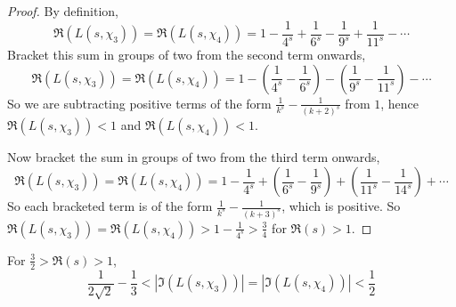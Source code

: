\documentclass{unswmaths}
\begin{document}
    \begin{proof}
        By definition,
        \begin{equation*}
            \Re(L(s,\chi_3)) = \Re(L(s,\chi_4)) = 1-\frac{1}{4^s}+\frac{1}{6^s}-\frac{1}{9^s}+\frac{1}{11^s}-\cdots
        \end{equation*}
        Bracket this sum in groups of two from the second term onwards,
        \begin{equation*}
            \Re(L(s,\chi_3)) = \Re(L(s,\chi_4)) = 1-(\frac{1}{4^s}-\frac{1}{6^s})-(\frac{1}{9^s}-\frac{1}{11^s})-\cdots
        \end{equation*}
        So we are subtracting positive terms of the form $\frac{1}{k^s}-\frac{1}{(k+2)^s}$ from $1$, hence $\Re(L(s,\chi_3)) < 1$
        and $\Re(L(s,\chi_4)) < 1$.
        
        Now bracket the sum in groups of two from the third term onwards,     
        \begin{equation*}
            \Re(L(s,\chi_3)) = \Re(L(s,\chi_4)) = 1-\frac{1}{4^s}+\left(\frac{1}{6^s}-\frac{1}{9^s}\right)+\left(\frac{1}{11^s}-\frac{1}{14^s}\right)+\cdots
        \end{equation*}
        So each bracketed term is of the form $\frac{1}{k^s}-\frac{1}{(k+3)^s}$, which is positive. So $\Re(L(s,\chi_3)) = \Re(L(s,\chi_4)) > 1-\frac{1}{4^s} > \frac{3}{4}$
        for $\Re(s) > 1$.
    \end{proof}
    \begin{lemma}
    \label{imBound}
        For $\frac{3}{2} > \Re(s) > 1$, 
        \begin{equation*}
            \frac{1}{2\sqrt{2}}-\frac{1}{3} < |\Im(L(s,\chi_3))| = |\Im(L(s,\chi_4))| < \frac{1}{2}
        \end{equation*}
    \end{lemma}
\end{document}
